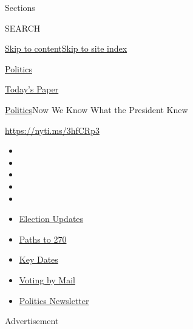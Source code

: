 Sections

SEARCH

\protect\hyperlink{site-content}{Skip to
content}\protect\hyperlink{site-index}{Skip to site index}

\href{https://www.nytimes3xbfgragh.onion/section/politics}{Politics}

\href{https://myaccount.nytimes3xbfgragh.onion/auth/login?response_type=cookie\&client_id=vi}{}

\href{https://www.nytimes3xbfgragh.onion/section/todayspaper}{Today's
Paper}

\href{/section/politics}{Politics}\textbar{}Now We Know What the
President Knew

\url{https://nyti.ms/3hfCRp3}

\begin{itemize}
\item
\item
\item
\item
\item
\end{itemize}

\begin{itemize}
\item
  \href{https://www.nytimes3xbfgragh.onion/live/2020/09/11/us/trump-vs-biden?action=click\&pgtype=Article\&state=default\&region=TOP_BANNER\&context=storylines_menu}{Election
  Updates}
\item
  \href{https://www.nytimes3xbfgragh.onion/interactive/2020/us/elections/election-states-biden-trump.html?action=click\&pgtype=Article\&state=default\&region=TOP_BANNER\&context=storylines_menu}{Paths
  to 270}
\item
  \href{https://www.nytimes3xbfgragh.onion/interactive/2019/us/elections/2020-presidential-election-calendar.html?action=click\&pgtype=Article\&state=default\&region=TOP_BANNER\&context=storylines_menu}{Key
  Dates}
\item
  \href{https://www.nytimes3xbfgragh.onion/interactive/2020/08/31/us/politics/vote-by-mail-deadlines.html?action=click\&pgtype=Article\&state=default\&region=TOP_BANNER\&context=storylines_menu}{Voting
  by Mail}
\item
  \href{https://www.nytimes3xbfgragh.onion/newsletters/politics?action=click\&pgtype=Article\&state=default\&region=TOP_BANNER\&context=storylines_menu}{Politics
  Newsletter}
\end{itemize}

Advertisement

